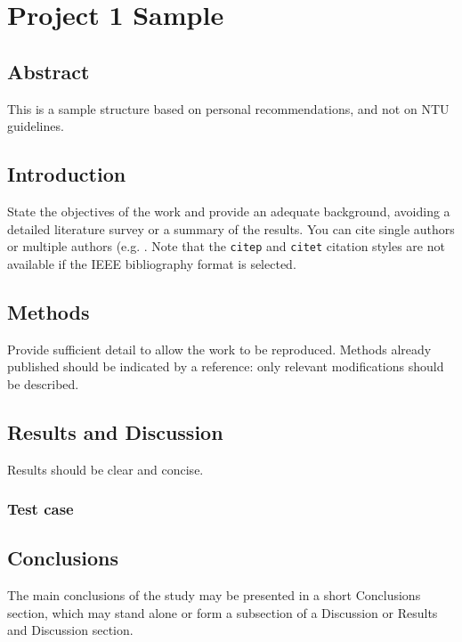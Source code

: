 \chapter[Project 1 Sample]{Project 1 Sample}\label{chap-sample}

\section{Abstract}

This is a sample structure based on personal recommendations, and not on NTU guidelines.

\section{Introduction}\label{section-intro}
State the objectives of the work and provide an adequate background, avoiding a detailed literature survey or a summary of the results. You can cite single authors \cite{connor2006inversion} or multiple authors (e.g. \cite{volentik2010modeling, costa2012, bonadonna2013}.  Note that the \texttt{citep} and \texttt{citet} citation styles are not available if the IEEE bibliography format is selected.

\section{Methods}\label{section-methods}

Provide sufficient detail to allow the work to be reproduced. Methods already published should be indicated by a reference: only relevant modifications should be described. 

\section{Results and Discussion}\label{section-results} 
Results should be clear and concise. 

\subsection{Test case}

\section{Conclusions}\label{section-conclusion}

The main conclusions of the study may be presented in a short Conclusions section, which may stand alone or form a subsection of a Discussion or Results and Discussion section.

